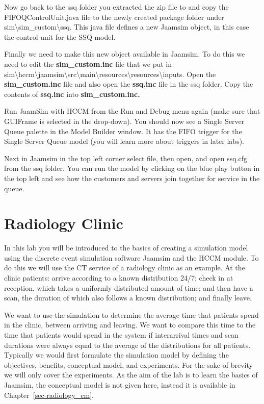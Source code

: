 \documentclass[
  10pt,
  a4paperpaper,
  DIV=11,
  numbers=noendperiod,
  oneside]{scrreprt}
\begin{document}
Now go back to the ssq folder you extracted the zip file to and copy the
FIFOQControlUnit.java file to the newly created package folder under
sim\textbackslash sim\_custom\textbackslash ssq. This java file defines
a new Jaamsim object, in this case the control unit for the SSQ model.

Finally we need to make this new object available in Jaamsim. To do this
we need to edit the \textbf{sim\_custom.inc} file that we put in
sim\textbackslash hccm\textbackslash jaamsim\textbackslash src\textbackslash main\textbackslash resources\textbackslash resources\textbackslash inputs.
Open the \textbf{sim\_custom.inc} file and also open the
\textbf{ssq.inc} file in the ssq folder. Copy the contents of
\textbf{ssq.inc} into \textbf{sim\_custom.inc.}

Run JaamSim with HCCM from the Run and Debug menu again (make sure that
GUIFrame is selected in the drop-down). You should now see a Single
Server Queue palette in the Model Builder window. It has the FIFO
trigger for the Single Server Queue model (you will learn more about
triggers in later labs).

Next in Jaamsim in the top left corner select file, then open, and open
ssq.cfg from the ssq folder. You can run the model by clicking on the
blue play button in the top left and see how the customers and servers
join together for service in the queue.

\chapter{Radiology Clinic}\label{radiology-clinic}

In this lab you will be introduced to the basics of creating a
simulation model using the discrete event simulation software Jaamsim
and the HCCM module. To do this we will use the CT service of a
radiology clinic as an example. At the clinic patients: arrive according
to a known distribution 24/7; check in at reception, which takes a
uniformly distributed amount of time; and then have a scan, the duration
of which also follows a known distribution; and finally leave.

We want to use the simulation to determine the average time that
patients spend in the clinic, between arriving and leaving. We want to
compare this time to the time that patients would spend in the system if
interarrival times and scan durations were always equal to the average
of the distributions for all patients. Typically we would first
formulate the simulation model by defining the objectives, benefits,
conceptual model, and experiments. For the sake of brevity we will only
cover the experiments. As the aim of the lab is to learn the basics of
Jaamsim, the conceptual model is not given here, instead it is available
in Chapter~\ref{sec-radiology_cm}.
\end{document}
